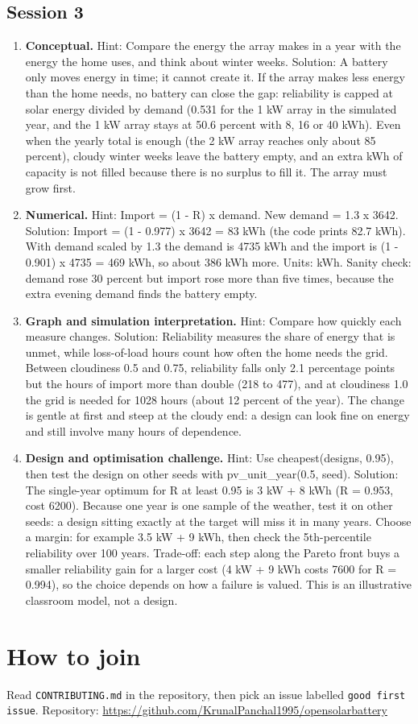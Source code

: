 \documentclass[11pt,a4paper]{article}
\begin{document}
\subsection*{Session 3}
\begin{enumerate}[nosep]
\item \textbf{Conceptual.} Hint: Compare the energy the array makes in a year with the energy the home uses, and think about winter weeks. Solution: A battery only moves energy in time; it cannot create it. If the array makes less energy than the home needs, no battery can close the gap: reliability is capped at solar energy divided by demand (0.531 for the 1 kW array in the simulated year, and the 1 kW array stays at 50.6 percent with 8, 16 or 40 kWh). Even when the yearly total is enough (the 2 kW array reaches only about 85 percent), cloudy winter weeks leave the battery empty, and an extra kWh of capacity is not filled because there is no surplus to fill it. The array must grow first.
\item \textbf{Numerical.} Hint: Import = (1 - R) x demand. New demand = 1.3 x 3642. Solution: Import = (1 - 0.977) x 3642 = 83 kWh (the code prints 82.7 kWh). With demand scaled by 1.3 the demand is 4735 kWh and the import is (1 - 0.901) x 4735 = 469 kWh, so about 386 kWh more. Units: kWh. Sanity check: demand rose 30 percent but import rose more than five times, because the extra evening demand finds the battery empty.
\item \textbf{Graph and simulation interpretation.} Hint: Compare how quickly each measure changes. Solution: Reliability measures the share of energy that is unmet, while loss-of-load hours count how often the home needs the grid. Between cloudiness 0.5 and 0.75, reliability falls only 2.1 percentage points but the hours of import more than double (218 to 477), and at cloudiness 1.0 the grid is needed for 1028 hours (about 12 percent of the year). The change is gentle at first and steep at the cloudy end: a design can look fine on energy and still involve many hours of dependence.
\item \textbf{Design and optimisation challenge.} Hint: Use cheapest(designs, 0.95), then test the design on other seeds with pv\_unit\_year(0.5, seed). Solution: The single-year optimum for R at least 0.95 is 3 kW + 8 kWh (R = 0.953, cost 6200). Because one year is one sample of the weather, test it on other seeds: a design sitting exactly at the target will miss it in many years. Choose a margin: for example 3.5 kW + 9 kWh, then check the 5th-percentile reliability over 100 years. Trade-off: each step along the Pareto front buys a smaller reliability gain for a larger cost (4 kW + 9 kWh costs 7600 for R = 0.994), so the choice depends on how a failure is valued. This is an illustrative classroom model, not a design.
\end{enumerate}

\section{How to join}
Read \texttt{CONTRIBUTING.md} in the repository, then pick an issue labelled \texttt{good first issue}. Repository: \url{https://github.com/KrunalPanchal1995/opensolarbattery}
\end{document}
